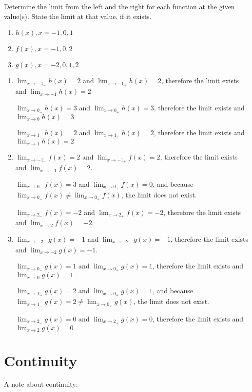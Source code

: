 \begin{Exercise}[title = Limits Practice 4, label=limits4]
Determine the limit from the left and the right for each function at the given value(s). State the limit at that value, if it exists.
    \begin{enumerate}
    \item $h(x), x=-1, 0, 1$
    \item $f(x), x=-1, 0, 2$
    \item $g(x), x=-2, 0, 1, 2$
\end{enumerate}
\end{Exercise}
\begin{Answer}[ref=limits4]
    \begin{enumerate}
    \item $\lim_{x\to-1_-}h(x) = 2$ and $\lim_{x\to-1_+}h(x)=2$, therefore the limit exists and $\lim_{x\to-1}h(x)=2$

    $\lim_{x\to0_-}h(x) = 3$ and $\lim_{x\to0_+}h(x)=3$, therefore the limit exists and $\lim_{x\to0}h(x)=3$

    $\lim_{x\to1_-}h(x) = 2$ and $\lim_{x\to1_+}h(x)=2$, therefore the limit exists and $\lim_{x\to1}h(x)=2$
    \item $\lim_{x\to-1_-}f(x)=2$ and $\lim_{x\to-1_+}f(x)=2$, therefore the limit exists and $\lim_{x\to-1}f(x) = 2$.

    $\lim_{x\to0_-}f(x) = 3$ and $\lim_{x\to0_+}f(x) = 0$, and because $\lim_{x\to0_-}f(x) \neq \lim_{x\to0_+}f(x)$, the limit does not exist.

    $\lim_{x\to2_-}f(x) = -2$ and $\lim_{x\to2_+}f(x) = -2$, therefore the limit exists and $\lim_{x\to2}f(x) = -2$.

    \item $\lim_{x\to-2_-}g(x) = -1$ and $\lim_{x\to-2_+}g(x) = -1$, therefore the limit exists and $\lim_{x\to-2}g(x) = -1$.

    $\lim_{x\to0_-}g(x)=1$ and $\lim_{x\to0_+}g(x) = 1$, therefore the limit exists and $\lim_{x\to0}g(x) = 1$

    $\lim_{x\to1_-}g(x) = 2$ and $\lim_{x\to0_+}g(x) = 1$, and because $\lim_{x\to1_-}g(x) = 2 \neq \lim_{x\to0_+}g(x)$, the limit does not exist.

    $\lim_{x\to2_-}g(x) = 0$ and $\lim_{x\to2_+}g(x) = 0$, therefore the limit exists and $\lim_{x\to2}g(x) = 0$
\end{enumerate}
\end{Answer}

\section{Continuity}
A note about continuity:

